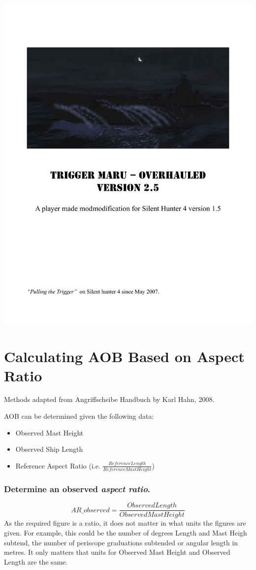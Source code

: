\documentclass{article}
\begin{document}
\includegraphics[page={28}, width=\textwidth, height=\textheight]{TMO_Manual}

\section{Calculating AOB Based on Aspect Ratio}

Methods adapted from Angriffscheibe Handbuch by Karl Hahn, 2008.

AOB can be determined given the following data:
\begin{itemize}
\item{Observed Mast Height}
\item{Observed Ship Length}
\item{Reference Aspect Ratio (i.e. $\frac{Reference Length}{Reference Mast Height}$)}
\end{itemize}

\subsubsection{Determine an observed \emph{aspect ratio}.}
$$AR\_{observed} = \frac{Observed Length}{Observed Mast Height}$$
As the required figure is a ratio, it does not matter in what units the figures are given. For example, this could be the number of degrees Length and Mast Heigh subtend, the number of periscope graduations subtended or angular length in metres. It only matters that units for Observed Mast Height and Observed Length are the same.
\end{document}
